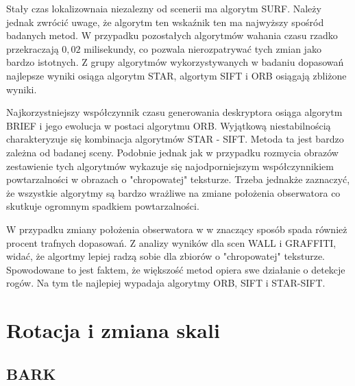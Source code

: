 Stały czas lokalizownaia niezalezny od scenerii ma algorytm SURF. Należy jednak zwrócić uwage, że algorytm ten wskaźnik ten ma najwyższy spośród badanych metod. W przypadku pozostałych algorytmów wahania czasu rzadko przekraczają $0,02$  milisekundy, co pozwala nierozpatrywać tych zmian jako bardzo istotnych. Z grupy algorytmów wykorzystywanych w badaniu dopasowań najlepsze wyniki osiąga algorytm STAR, algortym SIFT i ORB osiągają zbliżone wyniki.

Najkorzystniejszy współczynnik czasu generowania deskryptora osiąga algorytm BRIEF i jego ewolucja w postaci algorytmu ORB. Wyjątkową niestabilnością charakteryzuje się kombinacja algorytmów STAR - SIFT. Metoda ta jest bardzo zależna od badanej sceny. Podobnie jednak jak w przypadku rozmycia obrazów zestawienie tych algorytmów wykazuje się najodporniejszym współczynnikiem powtarzalności w obrazach o "chropowatej" teksturze. Trzeba jednakże zaznaczyć, że wszystkie algorytmy są bardzo wrażliwe na zmiane położenia obserwatora co skutkuje ogromnym spadkiem powtarzalności.

W przypadku zmiany położenia obserwatora w w znaczący sposób spada również procent trafnych dopasowań. Z analizy wyników dla scen WALL i GRAFFITI, widać, że algortmy lepiej radzą sobie dla zbiorów o "chropowatej" teksturze. Spowodowane to jest faktem, że większość metod opiera swe działanie o detekcje rogów. Na tym tle najlepiej wypadaja algorytmy ORB, SIFT i STAR-SIFT.







\FloatBarrier

\section{Rotacja i zmiana skali}
\FloatBarrier
\subsection{BARK}


